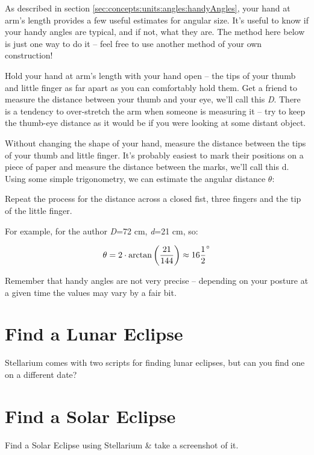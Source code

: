 As described in section %
\ref{sec:concepts:units:angles:handyAngles}, 
your hand at arm's length provides a few useful estimates for angular
size. It's useful to know if your handy angles are typical, and if not,
what they are. The method here below is just one way to do it -- feel
free to use another method of your own construction!

Hold your hand at arm's length with your hand open -- the tips of your
thumb and little finger as far apart as you can comfortably hold them.
Get a friend to measure the distance between your thumb and your eye,
we'll call this \emph{D}. There is a tendency to over-stretch the arm
when someone is measuring it -- try to keep the thumb-eye distance as it
would be if you were looking at some distant object.

Without changing the shape of your hand, measure the distance between
the tips of your thumb and little finger. It's probably easiest to mark
their positions on a piece of paper and measure the distance between the
marks, we'll call this d. Using some simple trigonometry, we can
estimate the angular distance $\theta$:

Repeat the process for the distance across a closed fist, three fingers
and the tip of the little finger.

For example, for the author \emph{D}=72 cm, \emph{d}=21 cm, so:

\begin{equation}
\theta = 2 \cdot \arctan{\left( \dfrac{21}{144} \right)} \approx 16\frac{1}{2}\degree
\end{equation}

Remember that handy angles are not very precise -- depending on your
posture at a given time the values may vary by a fair bit.

\section{Find a Lunar Eclipse}\label{find-a-lunar-eclipse}

Stellarium comes with two scripts for finding lunar eclipses, but can
you find one on a different date?

\section{Find a Solar Eclipse}\label{find-a-solar-eclipse}

Find a Solar Eclipse using Stellarium \& take a screenshot of it.